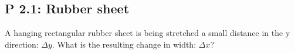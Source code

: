 \documentclass[a4paper,12pt]{article}
\begin{document}
\subsection*{P 2.1: Rubber sheet}
A hanging rectangular rubber sheet is being stretched a small distance in the y direction: $\Delta y$.  What is the resulting change in width: $\Delta x$?
\end{document}
